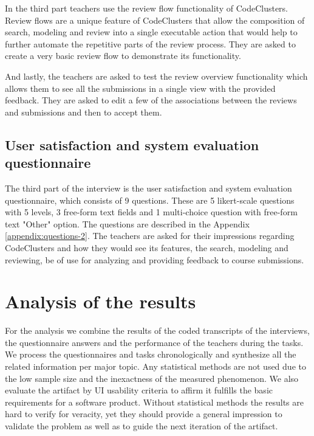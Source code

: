 In the third part teachers use the review flow functionality of CodeClusters. Review flows are a unique feature of CodeClusters that allow the composition of search, modeling and review into a single executable action that would help to further automate the repetitive parts of the review process. They are asked to create a very basic review flow to demonstrate its functionality.

And lastly, the teachers are asked to test the review overview functionality which allows them to see all the submissions in a single view with the provided feedback. They are asked to edit a few of the associations between the reviews and submissions and then to accept them.

\subsection{User satisfaction and system evaluation questionnaire}

The third part of the interview is the user satisfaction and system evaluation questionnaire, which consists of 9 questions. These are 5 likert-scale questions with 5 levels, 3 free-form text fields and 1 multi-choice question with free-form text "Other" option. The questions are described in the Appendix \ref{appendix:questions-2}. The teachers are asked for their impressions regarding CodeClusters and how they would see its features, the search, modeling and reviewing, be of use for analyzing and providing feedback to course submissions.

\section{Analysis of the results}

For the analysis we combine the results of the coded transcripts of the interviews, the questionnaire answers and the performance of the teachers during the tasks. We process the questionnaires and tasks chronologically and synthesize all the related information per major topic. Any statistical methods are not used due to the low sample size and the inexactness of the measured phenomenon. We also evaluate the artifact by UI usability criteria to affirm it fulfills the basic requirements for a software product. Without statistical methods the results are hard to verify for veracity, yet they should provide a general impression to validate the problem as well as to guide the next iteration of the artifact.
